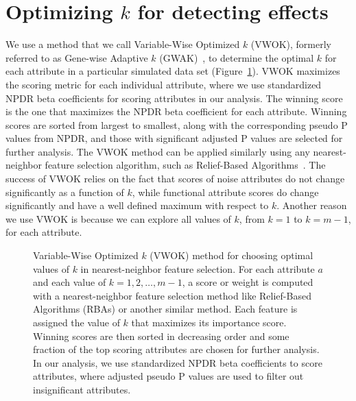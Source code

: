 \documentclass[10pt,letterpaper]{article}
\begin{document}
\section{Optimizing \texorpdfstring{$k$}{} for detecting effects}\label{sec:optim-k}

We use a method that we call Variable-Wise Optimized $k$ (VWOK), formerly referred to as Gene-wise Adaptive $k$ (GWAK)~\cite{mckinney13}, to determine the optimal $k$ for each attribute in a particular simulated data set (Figure~\ref{fig:vwok}). VWOK maximizes the scoring metric for each individual attribute, where we use standardized NPDR beta coefficients for scoring attributes in our analysis. The winning score is the one that maximizes the NPDR beta coefficient for each attribute. Winning scores are sorted from largest to smallest, along with the corresponding pseudo P values from NPDR, and those with significant adjusted P values are selected for further analysis. The VWOK method can be applied similarly using any nearest-neighbor feature selection algorithm, such as Relief-Based Algorithms~\cite{urbanowicz17}. The success of VWOK relies on the fact that scores of noise attributes do not change significantly as a function of $k$, while functional attribute scores do change significantly and have a well defined maximum with respect to $k$. Another reason we use VWOK is because we can explore all values of $k$, from $k=1$ to $k=m-1$, for each attribute.  

\begin{figure}[!hbt]
	\centering
	\caption{Variable-Wise Optimized $k$ (VWOK) method for choosing optimal values of $k$ in nearest-neighbor feature selection. For each attribute $a$ and each value of $k=1,2,\dots,m-1$, a score or weight is computed with a nearest-neighbor feature selection method like Relief-Based Algorithms (RBAs) or another similar method. Each feature is assigned the value of $k$ that maximizes its importance score. Winning scores are then sorted in decreasing order and some fraction of the top scoring attributes are chosen for further analysis. In our analysis, we use standardized NPDR beta coefficients to score attributes, where adjusted pseudo P values are used to filter out insignificant attributes.}\label{fig:vwok}
\end{figure}
\end{document}
